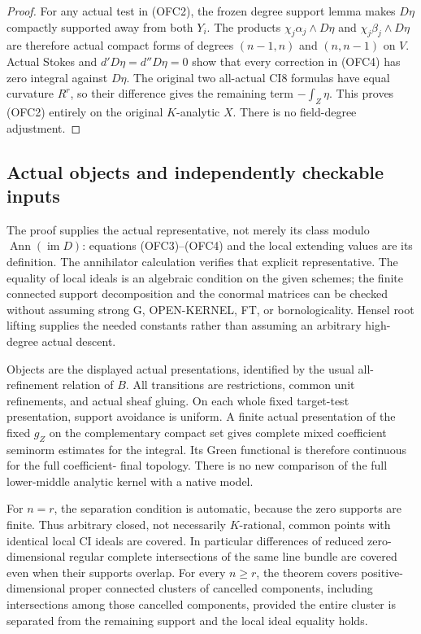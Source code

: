 \begin{proof}
For any actual test in (OFC2), the frozen degree support lemma
makes $D\eta$ compactly supported away from both $Y_i$.
The products $\chi_j\alpha_j\wedge D\eta$ and
$\chi_j\beta_j\wedge D\eta$ are therefore actual compact
forms of degrees $(n-1,n)$ and $(n,n-1)$ on $V$.
Actual Stokes and $d'D\eta=d''D\eta=0$ show that every
correction in (OFC4) has zero integral against $D\eta$.
The original two all-actual CI8 formulas have equal curvature
$R^r$, so their difference gives the remaining term
$-\int_Z\eta$.  This proves (OFC2) entirely on the original
$K$-analytic $X$.  There is no field-degree adjustment.
\end{proof}

\subsection{Actual objects and independently checkable inputs}

The proof supplies the actual representative, not merely its
class modulo $\operatorname{Ann}(\operatorname{im}D)$:
equations (OFC3)--(OFC4) and the local extending values are its
definition.  The annihilator calculation verifies that explicit
representative.  The equality of local ideals is an algebraic
condition on the given schemes; the finite connected support
decomposition and the conormal matrices can be checked without
assuming strong G, OPEN-KERNEL, FT, or bornologicality.
Hensel root lifting supplies the needed constants rather than
assuming an arbitrary high-degree actual descent.

Objects are the displayed actual presentations, identified by
the usual all-refinement relation of $B$.  All transitions are
restrictions, common unit refinements, and actual sheaf gluing.
On each whole fixed target-test presentation, support avoidance
is uniform.  A finite actual presentation of the fixed $g_Z$
on the complementary compact set gives complete mixed
coefficient seminorm estimates for the integral.  Its Green
functional is therefore continuous for the full coefficient-
final topology.  There is no new comparison of the full
lower-middle analytic kernel with a native model.

For $n=r$, the separation condition is automatic, because
the zero supports are finite.  Thus arbitrary closed, not
necessarily $K$-rational, common points with identical local
CI ideals are covered.  In particular differences of reduced
zero-dimensional regular complete intersections of the same
line bundle are covered even when their supports overlap.
For every $n\ge r$, the theorem covers positive-dimensional
proper connected clusters of cancelled components, including
intersections among those cancelled components, provided
the entire cluster is separated from the remaining support
and the local ideal equality holds.

